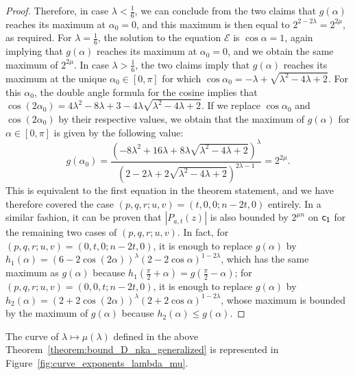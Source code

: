 \documentclass[11pt]{llncs}
\begin{document}
\begin{proof}
    Therefore, in case $\lambda<\frac 16$, we can conclude from the two claims that $g(\alpha)$ reaches its maximum at $\alpha_0=0$, and this maximum is then equal to $2^{2-2\lambda}=2^{2\mu}$, as required. For $\lambda=\frac 16$, the solution to the equation $\mathcal E$ is $\cos\alpha=1$, again implying that $g(\alpha)$ reaches its maximum at $\alpha_0=0$, and we obtain the same maximum of $2^{2\mu}$. In case $\lambda>\frac 16$, the two claims imply that $g(\alpha)$ reaches its maximum at the unique $\alpha_0\in[0,\pi]$ for which $\cos\alpha_0=-\lambda+\sqrt{\lambda^2-4\lambda+2}$. For this $\alpha_0$, the double angle formula for the cosine implies that $\cos(2\alpha_0)=4\lambda^2-8\lambda+3-4\lambda\sqrt{\lambda^2-4\lambda+2}$. If we replace $\cos\alpha_0$ and $\cos(2\alpha_0)$ by their respective values, we obtain that the maximum of $g(\alpha)$ for $\alpha\in[0,\pi]$ is given by the following value:
    \[
        g(\alpha_0)=\frac{\left(-8\lambda^2+16\lambda+8\lambda\sqrt{\lambda^2-4\lambda+2}\right)^{\lambda}}{\left(2-2\lambda+2\sqrt{\lambda^2-4\lambda+2}\right)^{2\lambda-1}}=2^{2\mu}.
    \]
    This is equivalent to the first equation in the theorem statement, 
    and we have therefore covered the case $(p,q,r;u,v)=(t,0,0;n-2t,0)$ entirely. In a similar fashion, it can be proven that $|P_{a,t}(z)|$ is also bounded by $2^{\mu n}$ on $\mathsf{c_1}$ for the remaining two cases of $(p,q,r;u,v)$. In fact, for $(p,q,r;u,v)=(0,t,0;n-2t,0)$, it is enough to replace $g(\alpha)$ by $h_1(\alpha)=(6-2\cos(2\alpha))^\lambda(2-2\cos\alpha)^{1-2\lambda}$, which has the same maximum as $g(\alpha)$ because $h_1\left(\frac{\pi}{2}+\alpha\right)=g\left(\frac{\pi}{2}-\alpha\right)$; for $(p,q,r;u,v)=(0,0,t;n-2t,0)$, it is enough to replace $g(\alpha)$ by $h_2(\alpha)=(2+2\cos(2\alpha))^\lambda(2+2\cos\alpha)^{1-2\lambda}$, whose maximum is bounded by the maximum of $g(\alpha)$ because $h_2(\alpha)\leq g(\alpha)$.
\end{proof}

The curve of $\lambda\mapsto\mu(\lambda)$ defined in the above Theorem~\ref{theorem:bound_D_nka_generalized} is represented in Figure~\ref{fig:curve_exponents_lambda_mu}.
\end{document}

